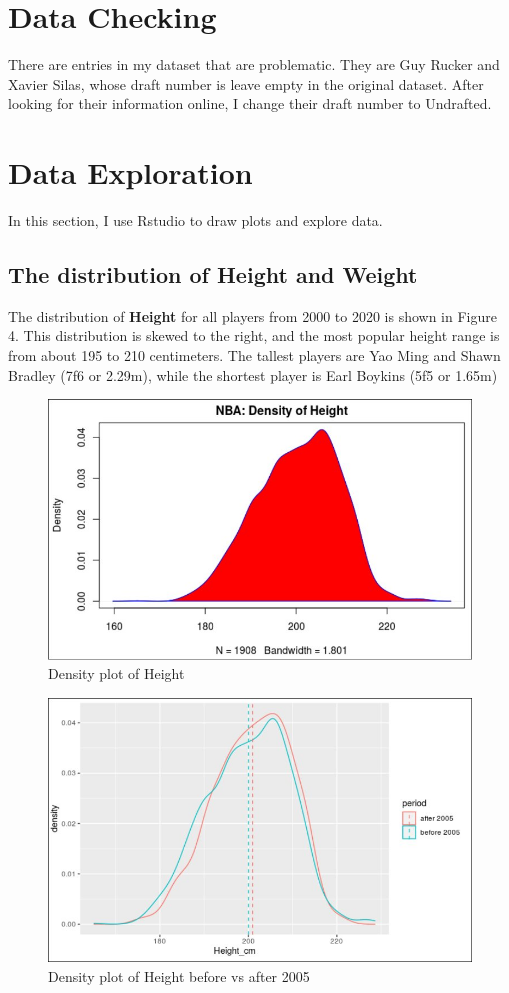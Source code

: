 \documentclass[a4paper,12pt,twoside]{article}
\numberwithin{equation}{section}
\begin{document}
\section{Data Checking}

There are entries in my dataset that are problematic. They are Guy Rucker and Xavier Silas, whose draft number is leave empty in the original dataset. After looking for their information online, I change their draft number to Undrafted.

\section{Data Exploration}
In this section, I use Rstudio to draw plots and explore data.
\subsection{The distribution of Height and Weight}
The distribution of \textbf{Height} for all players from 2000 to 2020 is shown in Figure 4. This distribution is skewed to the right, and the most popular height range is from about 195 to 210 centimeters. The tallest players are Yao Ming and Shawn Bradley (7f6 or 2.29m), while the shortest player is Earl Boykins (5f5 or 1.65m)

\begin{figure}[h]
\caption{Density plot of Height}
\includegraphics[scale=0.3]{dsoh.jpg}
\centering
\end{figure}

\begin{figure}[h]
\caption{Density plot of Height before vs after 2005}
\includegraphics[scale=0.33]{hebf05.jpg}
\centering
\end{figure}
\end{document}
